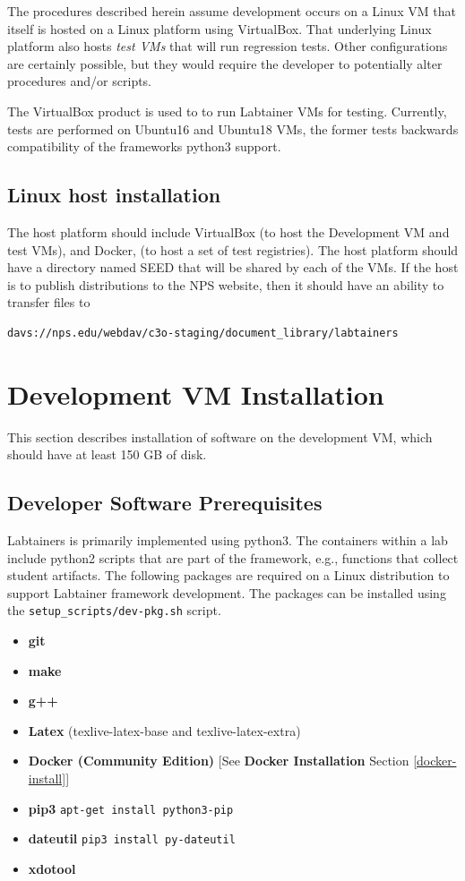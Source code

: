 \documentclass[12pt]{article}
\begin{document}
The procedures described herein assume development occurs on a Linux VM that itself is hosted on
a Linux platform using VirtualBox.  That underlying Linux platform also hosts \textit{test VMs} that
will run regression tests.  Other configurations are certainly possible, but they would require the
developer to potentially alter procedures and/or scripts.

The VirtualBox product is used to to run Labtainer VMs for testing.  Currently, tests are performed on 
Ubuntu16 and Ubuntu18 VMs, the former tests backwards compatibility of the frameworks python3 support.


\subsection{Linux host installation}
The host platform should include VirtualBox (to host the Development VM and test VMs),  and Docker, 
(to host a set of test registries).  The host platform should have a directory named SEED that will
be shared by each of the VMs.  If the host is to publish distributions to the NPS website, then it should
have an ability to transfer files to 
\begin{verbatim}
davs://nps.edu/webdav/c3o-staging/document_library/labtainers
\end{verbatim}

\section{Development VM Installation}
This section describes installation of software on the development VM, which should have at least 150 GB
of disk.
\subsection{Developer Software Prerequisites}
Labtainers is primarily implemented using python3.  The containers within a lab include python2 scripts that are
part of the framework, e.g., functions that collect student artifacts.  The following packages are required on a
Linux distribution to support Labtainer framework development.  The packages can be installed using the
{\tt setup\_scripts/dev-pkg.sh} script.

\begin {itemize}
\item {\bf git}
\item {\bf make}
\item {\bf g++}
\item {\bf Latex} (texlive-latex-base and texlive-latex-extra)
\item {\bf Docker (Community Edition)} [See {\bf Docker Installation} Section \ref{docker-install}]
\item {\bf pip3} {\tt apt-get install python3-pip}
\item {\bf dateutil} {\tt pip3 install py-dateutil}
\item {\bf xdotool} 
\end {itemize}
\end{document}
